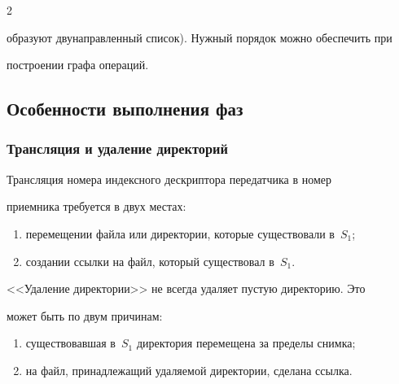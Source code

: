 \begin{multicols}{2}
{образуют двунаправленный список). Нужный порядок можно обеспечить при 


построении графа операций.}





\subsection{Особенности выполнения фаз}





\subsubsection{Трансляция и удаление директорий} %


      


      Трансляция номера индексного дескриптора передатчика в номер 


приемника требуется в двух \mbox{местах:}


      \begin{enumerate}[(1)]


\item перемещении файла или директории, которые существовали в~$S_1$;


\item создании ссылки на файл, который существовал в~$S_1$.


\end{enumerate}





      <<Удаление директории>> не всегда удаляет пустую директорию. Это 


может быть по двум причинам:


      \begin{enumerate}[(1)]


\item существовавшая в~$S_1$ директория перемещена за пределы снимка;


\item на файл, принадлежащий удаляемой директории, сделана ссылка.   


\end{enumerate}





\begin{table}\small



\end{table}
\end{multicols}
